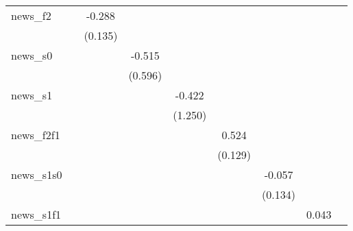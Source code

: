 {\begin{tabular}{l*{8}{c}}
\addlinespace
news\_f2     &                     &      -0.288\sym{**} &                     &                     &                     &                     &                     &                     \\
            &                     &     (0.135)         &                     &                     &                     &                     &                     &                     \\
\addlinespace
news\_s0     &                     &                     &      -0.515         &                     &                     &                     &                     &                     \\
            &                     &                     &     (0.596)         &                     &                     &                     &                     &                     \\
\addlinespace
news\_s1     &                     &                     &                     &      -0.422         &                     &                     &                     &                     \\
            &                     &                     &                     &     (1.250)         &                     &                     &                     &                     \\
\addlinespace
news\_f2f1   &                     &                     &                     &                     &       0.524\sym{***}&                     &                     &                     \\
            &                     &                     &                     &                     &     (0.129)         &                     &                     &                     \\
\addlinespace
news\_s1s0   &                     &                     &                     &                     &                     &      -0.057         &                     &                     \\
            &                     &                     &                     &                     &                     &     (0.134)         &                     &                     \\
\addlinespace
news\_s1f1   &                     &                     &                     &                     &                     &                     &       0.043         &                     \\

\end{tabular}}
